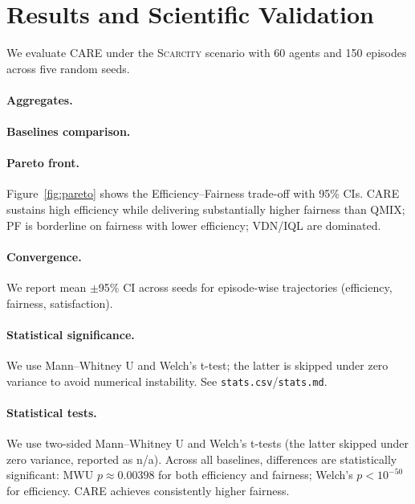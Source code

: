 ﻿\section{Results and Scientific Validation}
We evaluate CARE under the \textsc{Scarcity} scenario with 60 agents and 150 episodes across five random seeds.

\paragraph{Aggregates.}


\paragraph{Baselines comparison.}


\paragraph{Pareto front.}
Figure~\ref{fig:pareto} shows the Efficiency--Fairness trade-off with 95\% CIs. CARE sustains high efficiency while delivering substantially higher fairness than QMIX; PF is borderline on fairness with lower efficiency; VDN/IQL are dominated.

\paragraph{Convergence.}
We report mean $\pm$95\% CI across seeds for episode-wise trajectories (efficiency, fairness, satisfaction).

\paragraph{Statistical significance.}
We use Mann--Whitney U and Welch’s t-test; the latter is skipped under zero variance to avoid numerical instability. See \texttt{stats.csv}/\texttt{stats.md}.
\paragraph{Statistical tests.}
We use two-sided Mann--Whitney U and Welch’s t-tests (the latter skipped under zero variance, reported as n/a).
Across all baselines, differences are statistically significant: MWU $p\approx0.00398$ for both efficiency and fairness; 
Welch’s $p<10^{-50}$ for efficiency. CARE achieves consistently higher fairness.
